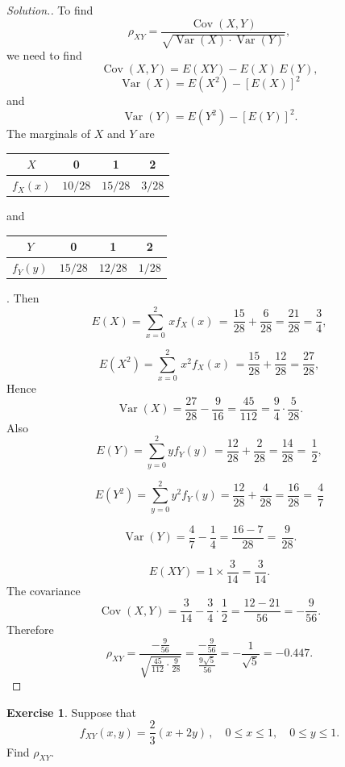 \documentclass[12pt,a4paper]{report}
\theoremstyle{definition}
\newtheorem{exe}[thm]{Exercise}
\theoremstyle{plain}
\theoremstyle{definition}
\begin{document}
\begin{proof}[\textit{Solution}.]
To find 
\[\rho_{XY}=\frac{\operatorname{Cov}(X,Y)}{\sqrt{\operatorname{Var}(X)\cdot \operatorname{Var}(Y)}},\]
we need to find
\[\operatorname{Cov}(X,Y)=E(XY)-E(X)\,E(Y),\]
\[\operatorname{Var}(X)=E(X^2)-[E(X)]^2\]
and
\[\operatorname{Var}(Y)=E(Y^2)-[E(Y)]^2.\]
The marginals of $X$ and $Y$ are 
\begin{table}[H]
\centering
\begin{tabular}{c|ccc}
$X$ & 0  & 1 & 2\\
\hline $f_X(x)$ & $10/28$ & $15/28$ & $3/28$\\
\end{tabular}
\end{table}
and
\begin{table}[H]
\centering
\begin{tabular}{c|ccc}
$Y$ & 0 & 1 & 2\\
\hline
$f_Y(y)$ & $15/28$ & $12/28$ & $1/28$\\
\end{tabular}
\end{table}.
Then
\[E(X)=\sum^2_{x=0}\,xf_X(x)\, =\, \frac{15}{28}+\frac{6}{28}=\frac{21}{28}=\frac{3}{4},\]

\[E(X^2)=\sum^2_{x=0}\, x^2f_X(x)\, =\frac{15}{28}+\frac{12}{28}=\frac{27}{28},\]
Hence
\[\operatorname{Var}(X)=\frac{27}{28}-\frac{9}{16}=\frac{45}{112}=\frac{9}{4}\cdot\frac{5}{28}.\]
Also
\[E(Y)=\sum^2_{y=0}yf_Y(y)\, =\frac{12}{28}+\frac{2}{28}=\frac{14}{28}=\, \frac{1}{2},\]

\[E(Y^2)=\sum^2_{y=0}y^2f_Y(y)=\frac{12}{28}+\frac{4}{28}=\frac{16}{28}=\,\frac{4}{7}\]

\[\operatorname{Var}(Y)=\frac{4}{7}-\frac{1}{4}=\frac{16-7}{28}=\, \frac{9}{28}.\]

\[E(XY)=1\times \frac{3}{14}=\frac{3}{14}.\]
The covariance 
\[\operatorname{Cov}(X,Y)= \frac{3}{14}-\frac{3}{4}\cdot \frac{1}{2} = \frac{12 - 21}{56} = -\frac{9}{56}.\]
Therefore
\[\rho_{XY}  =\frac{-\frac{9}{56}}{\sqrt{\frac{45}{112}\cdot\frac{9}{28}}} = \frac{-\frac{9}{56}}{\frac{9\sqrt5}{56}} = -\frac{1}{\sqrt{5}} = -0.447 .\]
\end{proof}






\begin{exe}
Suppose that \[f_{XY}(x,y)=\frac{2}{3}(x  + 2y)\, , \quad 0 \leq x \leq 1, \quad 0\leq y \leq 1.\]
Find $\rho_{XY}$.
\end{exe}
\end{document}
